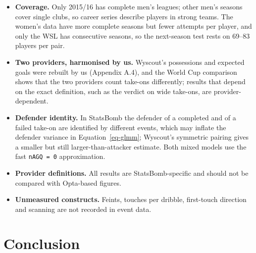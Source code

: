 \documentclass[
  12pt]{article}
\begin{document}
\begin{itemize}
  shrunk rating over the context model alone is small
  (Figure~\ref{fig-validity}), as expected from a skill spread of 5.8
  points; it is the gain over the raw rate that is large.
\item
  \textbf{Coverage.} Only 2015/16 has complete men's leagues; other
  men's seasons cover single clubs, so career series describe players in
  strong teams. The women's data have more complete seasons but fewer
  attempts per player, and only the WSL has consecutive seasons, so the
  next-season test rests on 69--83 players per pair.
\item
  \textbf{Two providers, harmonised by us.} Wyscout's possessions and
  expected goals were rebuilt by us (Appendix A.4), and the World Cup
  comparison shows that the two providers count take-ons differently;
  results that depend on the exact definition, such as the verdict on
  wide take-ons, are provider-dependent.
\item
  \textbf{Defender identity.} In StatsBomb the defender of a completed
  and of a failed take-on are identified by different events, which may
  inflate the defender variance in Equation~\ref{eq-glmm}; Wyscout's
  symmetric pairing gives a smaller but still larger-than-attacker
  estimate. Both mixed models use the fast \texttt{nAGQ\ =\ 0}
  approximation.
\item
  \textbf{Provider definitions.} All results are StatsBomb-specific and
  should not be compared with Opta-based figures.
\item
  \textbf{Unmeasured constructs.} Feints, touches per dribble,
  first-touch direction and scanning are not recorded in event data.
\end{itemize}

\section{Conclusion}\label{sec-conclusion}
\end{document}
